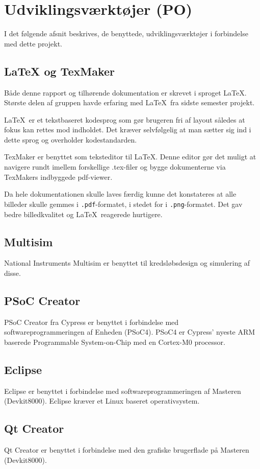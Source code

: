 
\chapter{Udviklingsværktøjer (PO)} \label{head:udviklingsvaektoejer}
I det følgende afsnit beskrives, de benyttede, udviklingsværktøjer i forbindelse med dette projekt. 

\section{LaTeX og TexMaker}
Både denne rapport og tilhørende dokumentation er skrevet i sproget \LaTeX. Største delen af gruppen havde erfaring med \LaTeX \ fra sidste semester projekt. 

\LaTeX \ er et tekstbaseret kodesprog som gør brugeren fri af layout således at fokus kan rettes mod indholdet. Det kræver selvfølgelig at man sætter sig ind i dette sprog og overholder kodestandarden. 

TexMaker er benyttet som teksteditor til \LaTeX. Denne editor gør det muligt at navigere rundt imellem forskellige .tex-filer og bygge dokumenterne via TexMakers indbyggede pdf-viewer.

Da hele dokumentationen skulle laves færdig  kunne det konstateres at alle billeder skulle gemmes i \verb+.pdf+-formatet, i stedet for i \verb+.png+-formatet. Det gav bedre billedkvalitet og \LaTeX\ reagerede hurtigere.

\section{Multisim}
National Instruments Multisim er benyttet til kredsløbsdesign og simulering af disse. 

\section{PSoC Creator}
PSoC Creator fra Cypress er benyttet i forbindelse med softwareprogrammeringen af Enheden (PSoC4). PSoC4 er Cypress' nyeste ARM baserede Programmable System-on-Chip med en Cortex-M0 processor. 

\section{Eclipse}
Eclipse er benyttet i forbindelse med softwareprogrammeringen af Masteren (Devkit8000). Eclipse kræver et Linux baseret operativsystem.

\section{Qt Creator}
Qt Creator er benyttet i forbindelse med den grafiske brugerflade på Masteren (Devkit8000).

